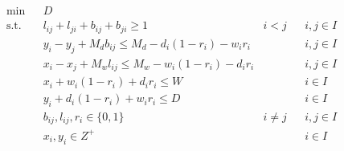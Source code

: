 \begin{equation*}
	\begin{aligned}
		& \underset{}{\text{min}}
		& & D \\
		  & \text{s.t.} &   & l_{ij} + l_{ji} + b_{ij} + b_{ji} \geq 1                  & i < j    &   & i,j \in I \\
		  &             &   & y_i - y_j + M_d b_{ij} \leq M_d - d_i (1 - r_i) - w_i r_i &          &   & i,j \in I \\
		  &             &   & x_i - x_j + M_w l_{ij} \leq M_w - w_i (1 - r_i) - d_i r_i &          &   & i,j \in I \\
		  &             &   & x_i + w_i (1 - r_i) + d_i r_i \leq W                      &          &   & i \in I   \\
		  &             &   & y_i + d_i (1 - r_i) + w_i r_i \leq D                      &          &   & i \in I   \\
		  &             &   & b_{ij}, l_{ij}, r_i \in \{0,1\}                           & i \neq j &   & i,j \in I \\
		  &             &   & x_{i}, y_{i} \in Z^{+}                                    &          &   & i \in I   \\
	\end{aligned}
\end{equation*}

\newpage

